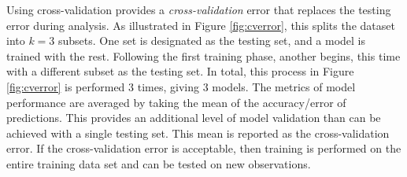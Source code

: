 Using cross-validation provides a \textit{cross-validation} error that replaces
the testing error during analysis.  As illustrated in Figure \ref{fig:cverror},
this splits the dataset into $k=3$ subsets. One set is designated as the
testing set, and a model is trained with the rest. Following the first training
phase, another begins, this time with a different subset as the testing set.
In total, this process in Figure \ref{fig:cverror} is performed $3$ times,
giving $3$ models. The metrics of model performance are averaged by taking the
mean of the accuracy/error of predictions.  This provides an additional level
of model validation than can be achieved with a single testing set. This mean
is reported as the cross-validation error. If the cross-validation error is
acceptable, then training is performed on the entire training data set and can
be tested on new observations.
